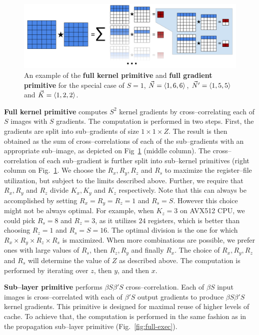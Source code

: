   \begin{figure}
     \centering
     \includegraphics[width=0.99\linewidth]{fig/update2}
     \caption{An example of the {\bf full kernel primitive} and {\bf
         full gradient primitive} for the special case of $S=1$,
       $\vec{N}=\langle1,6,6\rangle$, $\vec{N}' = \langle1,5,5\rangle$ and
       $\vec{K}=\langle1,2,2\rangle$.}
     \label{fig:conv-decomposition}
   \end{figure}

  {\bf Full kernel primitive} computes $S^2$ kernel gradients by
  cross--correlating each of $S$ images with $S$ gradients.  The
  computation is performed in two steps.  First, the gradients are
  split into sub--gradients of size $1 \times 1 \times Z$.  The result
  is then obtained as the sum of cross--correlations of each of the
  sub--gradients with an appropriate sub--image, as depicted on
  Fig~\ref{fig:conv-decomposition} (middle column).  The
  cross--correlation of each sub--gradient is further split into
  sub--kernel primitives (right column on
  Fig.~\ref{fig:conv-decomposition}.  We choose the $R_x, R_y, R_z$
  and $R_s$ to maximize the register--file utilization, but subject to
  the limits described above.  Further, we require that $R_x, R_y$ and
  $R_z$ divide $K_x, K_y$ and $K_z$ respectively.  Note that this can
  always be accomplished by setting $R_x=R_y=R_z=1$ and $R_s=S$.
  However this choice might not be always optimal.  For example, when
  $K_z=3$ on AVX512 CPU, we could pick $R_s=8$ and $R_z=3$, as it
  utilizes $24$ registers, which is better than choosing $R_z=1$ and
  $R_s=S=16$.  The optimal division is the one for which $R_x \times
  R_y \times R_z \times R_s$ is maximized.  When more combinations are
  possible, we prefer ones with large values of $R_s$, then $R_z, R_y$
  and finally $R_x$.  The choice of $R_x, R_y, R_z$ and $R_s$ will
  determine the value of $Z$ as described above.  The computation is
  performed by iterating over $z$, then $y$, and then $x$.

  {\bf Sub--layer primitive} performs $\beta S \beta' S$
  cross--correlation.  Each of $\beta S$ input images is
  cross--correlated with each of $\beta'S$ output gradients to produce
  $\beta S \beta' S$ kernel gradients.  This primitive is designed for
  maximal reuse of higher levels of cache.  To achieve that, the
  computation is performed in the same fashion as in the propagation
  sub--layer primitive (Fig.~\ref{fig:full-exec}).

